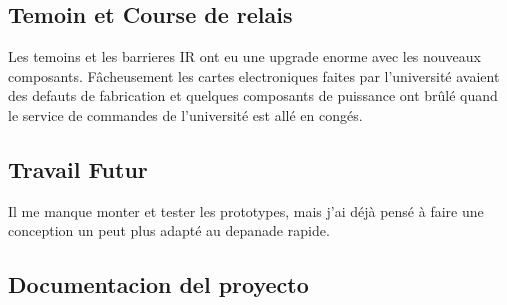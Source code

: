 \documentclass[12pt]{article}
\begin{document}


\subsection{Temoin et Course de relais}
\begin{par}
	Les temoins et les barrieres IR ont eu une upgrade 
	enorme avec les nouveaux composants. Fâcheusement
	les cartes electroniques faites par l'université
	avaient des defauts de fabrication et quelques
	composants de puissance ont br\^ul\'e quand le service
	de commandes de l'université est allé en congés.
\end{par}
\subsection*{Travail Futur}
\begin{par}
	Il me manque monter et tester les prototypes, mais j'ai déjà pensé
	à faire une conception un peut plus adapté au depanade rapide.
\end{par}


\subsection{Documentacion del proyecto}
\end{document}
